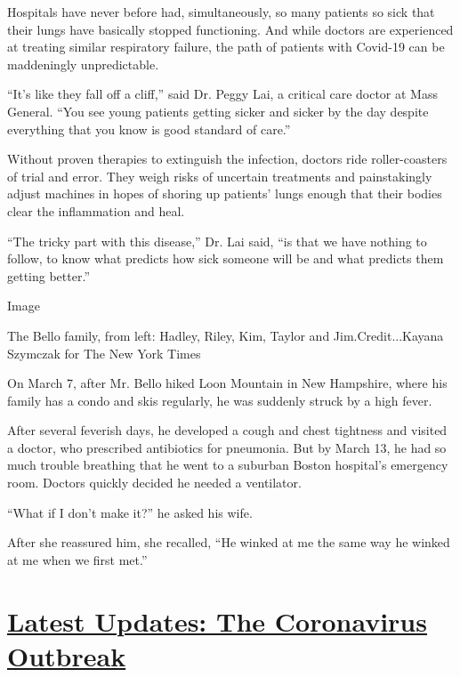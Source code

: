 Hospitals have never before had, simultaneously, so many patients so
sick that their lungs have basically stopped functioning. And while
doctors are experienced at treating similar respiratory failure, the
path of patients with Covid-19 can be maddeningly unpredictable.

``It's like they fall off a cliff,'' said Dr. Peggy Lai, a critical care
doctor at Mass General. ``You see young patients getting sicker and
sicker by the day despite everything that you know is good standard of
care.''

Without proven therapies to extinguish the infection, doctors ride
roller-coasters of trial and error. They weigh risks of uncertain
treatments and painstakingly adjust machines in hopes of shoring up
patients' lungs enough that their bodies clear the inflammation and
heal.

``The tricky part with this disease,'' Dr. Lai said, ``is that we have
nothing to follow, to know what predicts how sick someone will be and
what predicts them getting better.''

Image

The Bello family, from left: Hadley, Riley, Kim, Taylor and
Jim.Credit...Kayana Szymczak for The New York Times

On March 7, after Mr. Bello hiked Loon Mountain in New Hampshire, where
his family has a condo and skis regularly, he was suddenly struck by a
high fever.

After several feverish days, he developed a cough and chest tightness
and visited a doctor, who prescribed antibiotics for pneumonia. But by
March 13, he had so much trouble breathing that he went to a suburban
Boston hospital's emergency room. Doctors quickly decided he needed a
ventilator.

``What if I don't make it?'' he asked his wife.

After she reassured him, she recalled, ``He winked at me the same way he
winked at me when we first met.''

\hypertarget{latest-updates-the-coronavirus-outbreak}{%
\section{\texorpdfstring{\href{https://www.nytimes3xbfgragh.onion/2020/08/21/world/covid-19-coronavirus.html?action=click\&pgtype=Article\&state=default\&region=MAIN_CONTENT_1\&context=storylines_live_updates}{Latest
Updates: The Coronavirus
Outbreak}}{Latest Updates: The Coronavirus Outbreak}}\label{latest-updates-the-coronavirus-outbreak}}

